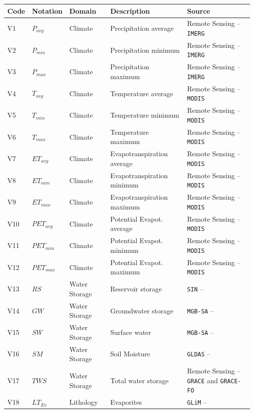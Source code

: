 \documentclass[12pt]{article}
\begin{document}
\begin{table}[t]
\centering
\tiny
{}
\begin{tabular}{p{0.5cm}p{1cm}p{2cm}p{3.5cm}p{5cm}}
\toprule
\textbf{Code} & \textbf{Notation} & \textbf{Domain} & \textbf{Description} & \textbf{Source} \\
\midrule
V1 & $P_{avg}$ & Climate & Precipitation average & Remote Sensing -- \texttt{IMERG}\\
V2 & $P_{min}$ & Climate & Precipitation minimum & Remote Sensing -- \texttt{IMERG}\\
V3 & $P_{max}$ & Climate & Precipitation maximum & Remote Sensing -- \texttt{IMERG}\\
V4 & $T_{avg}$ & Climate & Temperature average & Remote Sensing -- \texttt{MODIS}\\
V5 & $T_{min}$ & Climate & Temperature minimum & Remote Sensing -- \texttt{MODIS}\\
V6 & $T_{max}$ & Climate & Temperature maximum & Remote Sensing -- \texttt{MODIS}\\
V7 & $ET_{avg}$ & Climate & Evapotranspiration average & Remote Sensing -- \texttt{MODIS}\\
V8 & $ET_{min}$ & Climate & Evapotranspiration minimum & Remote Sensing -- \texttt{MODIS}\\
V9 & $ET_{max}$ & Climate & Evapotranspiration maximum & Remote Sensing -- \texttt{MODIS}\\
V10 & $PET_{avg}$ & Climate & Potential Evapot. average & Remote Sensing -- \texttt{MODIS}\\
V11 & $PET_{min}$ & Climate & Potential Evapot. minimum & Remote Sensing -- \texttt{MODIS}\\
V12 & $PET_{max}$ & Climate & Potential Evapot. maximum & Remote Sensing -- \texttt{MODIS}\\
V13 & $RS$ & Water Storage & Reservoir storage & \texttt{SIN}  -- \cite{ana2021}\\
V14 & $GW$ & Water Storage & Groundwater storage & \texttt{MGB-SA} -- \cite{siqueira2018}\\
V15 & $SW$ & Water Storage & Surface water & \texttt{MGB-SA} -- \cite{siqueira2018}\\
V16 & $SM$ & Water Storage & Soil Moisture & \texttt{GLDAS} -- \cite{rodell2004}\\
V17 & $TWS$ & Water Storage & Total water storage & Remote Sensing -- \texttt{GRACE} and \texttt{GRACE-FO}\\
V18 & $LT_{Ev}$ & Lithology & Evaporites & \texttt{GLiM}  -- \cite{hartmann2012}\\

\end{tabular}
\end{table}
\end{document}

